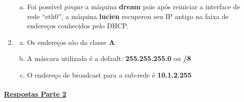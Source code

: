 \documentclass[a4paper, 12pt]{article}
\begin{document}
\begin{enumerate}
\begin{enumerate}[a.]
\item Foi possível \emph{pingar} a máquina {\bf dream} pois após
  reiniciar a interface de rede ``eth0'', a máquina {\bf lucien}
  recuperou seu IP antigo na faixa de endereços conhecidos pelo DHCP.

\end{enumerate}

\item 
\begin{enumerate}[a.]

\item Os endereços são da classe {\bf A}.

\item A máscara utilizada é a default: {\bf 255.255.255.0} ou {\bf /8}

\item O endereço de broadcast para a sub-rede é {\bf 10.1.2.255}

\end{enumerate}

\end{enumerate}

\FloatBarrier
\paragraph{\underline{Respostas Parte 2}}
\end{document}
